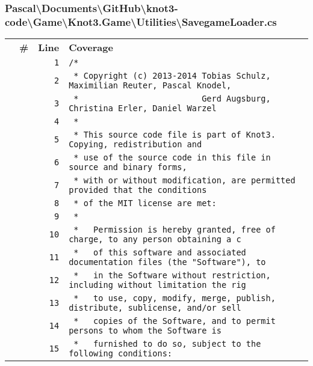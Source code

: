 \documentclass[a4paper,10pt]{article}
\begin{document}
\subsubsection{Pascal\textbackslash Documents\textbackslash GitHub\textbackslash knot3-code\textbackslash Game\textbackslash Knot3.Game\textbackslash Utilities\textbackslash SavegameLoader.cs}
\begin{longtable}[l]{lrrl}
\textbf{} & \textbf{\#} & \textbf{Line} & \textbf{Coverage}\\
\cellcolor{gray} &  & \verb~1~ & \verb~/*~\\
\cellcolor{gray} &  & \verb~2~ & \verb~ * Copyright (c) 2013-2014 Tobias Schulz, Maximilian Reuter, Pascal Knodel,~\\
\cellcolor{gray} &  & \verb~3~ & \verb~ *                         Gerd Augsburg, Christina Erler, Daniel Warzel~\\
\cellcolor{gray} &  & \verb~4~ & \verb~ *~\\
\cellcolor{gray} &  & \verb~5~ & \verb~ * This source code file is part of Knot3. Copying, redistribution and~\\
\cellcolor{gray} &  & \verb~6~ & \verb~ * use of the source code in this file in source and binary forms,~\\
\cellcolor{gray} &  & \verb~7~ & \verb~ * with or without modification, are permitted provided that the conditions~\\
\cellcolor{gray} &  & \verb~8~ & \verb~ * of the MIT license are met:~\\
\cellcolor{gray} &  & \verb~9~ & \verb~ *~\\
\cellcolor{gray} &  & \verb~10~ & \verb~ *   Permission is hereby granted, free of charge, to any person obtaining a c~\\
\cellcolor{gray} &  & \verb~11~ & \verb~ *   of this software and associated documentation files (the "Software"), to ~\\
\cellcolor{gray} &  & \verb~12~ & \verb~ *   in the Software without restriction, including without limitation the rig~\\
\cellcolor{gray} &  & \verb~13~ & \verb~ *   to use, copy, modify, merge, publish, distribute, sublicense, and/or sell~\\
\cellcolor{gray} &  & \verb~14~ & \verb~ *   copies of the Software, and to permit persons to whom the Software is~\\
\cellcolor{gray} &  & \verb~15~ & \verb~ *   furnished to do so, subject to the following conditions:~\\

\end{longtable}
\end{document}
